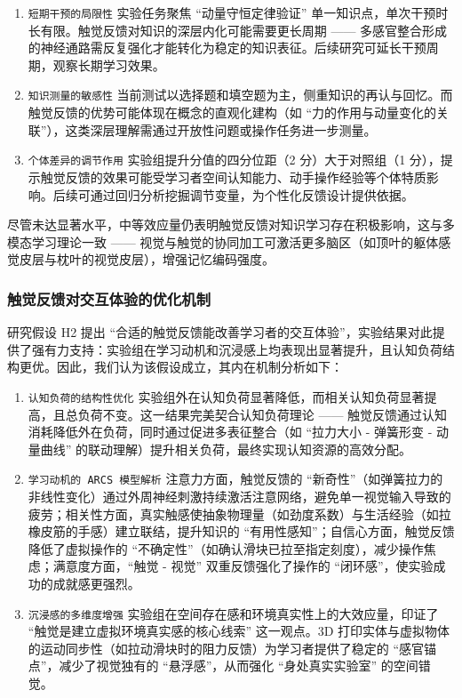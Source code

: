 \documentclass[runningheads]{llncs}
\begin{document}
\begin{enumerate}[label={\arabic*)}]
  \item \texttt{短期干预的局限性} 实验任务聚焦 “动量守恒定律验证” 单一知识点，单次干预时长有限。触觉反馈对知识的深层内化可能需要更长周期 —— 多感官整合形成的神经通路需反复强化才能转化为稳定的知识表征。后续研究可延长干预周期，观察长期学习效果。
  \item \texttt{知识测量的敏感性} 当前测试以选择题和填空题为主，侧重知识的再认与回忆。而触觉反馈的优势可能体现在概念的直观化建构（如 “力的作用与动量变化的关联”），这类深层理解需通过开放性问题或操作任务进一步测量。
  \item \texttt{个体差异的调节作用} 实验组提升分值的四分位距（2 分）大于对照组（1 分），提示触觉反馈的效果可能受学习者空间认知能力、动手操作经验等个体特质影响。后续可通过回归分析挖掘调节变量，为个性化反馈设计提供依据。
\end{enumerate}

尽管未达显著水平，中等效应量仍表明触觉反馈对知识学习存在积极影响，这与多模态学习理论一致 —— 视觉与触觉的协同加工可激活更多脑区（如顶叶的躯体感觉皮层与枕叶的视觉皮层），增强记忆编码强度。

\subsubsection{触觉反馈对交互体验的优化机制}
研究假设 H2 提出 “合适的触觉反馈能改善学习者的交互体验”，实验结果对此提供了强有力支持：实验组在学习动机和沉浸感上均表现出显著提升，且认知负荷结构更优。因此，我们认为该假设成立，其内在机制分析如下：

\begin{enumerate}[label={\arabic*)}]
  \item \texttt{认知负荷的结构性优化} 实验组外在认知负荷显著降低，而相关认知负荷显著提高，且总负荷不变。这一结果完美契合认知负荷理论 —— 触觉反馈通过认知消耗降低外在负荷，同时通过促进多表征整合（如 “拉力大小 - 弹簧形变 - 动量曲线” 的联动理解）提升相关负荷，最终实现认知资源的高效分配。
  \item \texttt{学习动机的 ARCS 模型解析} 注意力方面，触觉反馈的 “新奇性”（如弹簧拉力的非线性变化）通过外周神经刺激持续激活注意网络，避免单一视觉输入导致的疲劳；相关性方面，真实触感使抽象物理量（如劲度系数）与生活经验（如拉橡皮筋的手感）建立联结，提升知识的 “有用性感知”；自信心方面，触觉反馈降低了虚拟操作的 “不确定性”（如确认滑块已拉至指定刻度），减少操作焦虑；满意度方面，“触觉 - 视觉” 双重反馈强化了操作的 “闭环感”，使实验成功的成就感更强烈。
  \item \texttt{沉浸感的多维度增强} 实验组在空间存在感和环境真实性上的大效应量，印证了 “触觉是建立虚拟环境真实感的核心线索” 这一观点。3D 打印实体与虚拟物体的运动同步性（如拉动滑块时的阻力反馈）为学习者提供了稳定的 “感官锚点”，减少了视觉独有的 “悬浮感”，从而强化 “身处真实实验室” 的空间错觉。
\end{enumerate}
\end{document}

